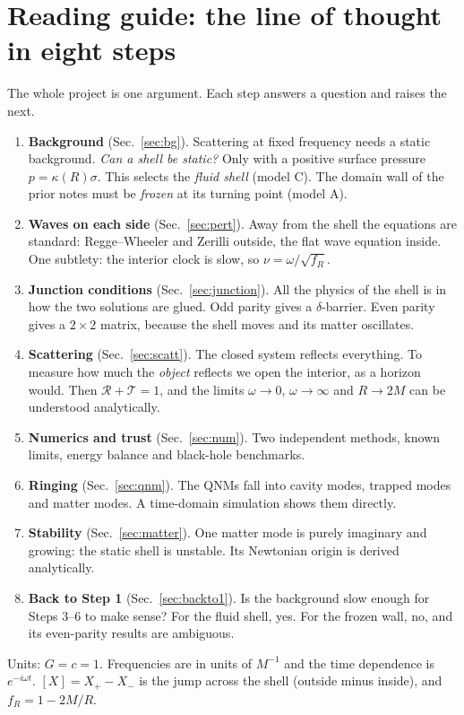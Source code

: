 \documentclass[11pt,a4paper]{article}
\numberwithin{equation}{section}
\newcommand{\sq}{\sqrt{f_R}}
\newcommand{\RR}{\mathcal R}
\newcommand{\TT}{\mathcal T}
\begin{document}
\section*{Reading guide: the line of thought in eight steps}
The whole project is one argument. Each step answers a question and raises the next.
\begin{enumerate}[label=\textbf{Step \arabic*.},leftmargin=4.2em]
\item \textbf{Background} (Sec.~\ref{sec:bg}). Scattering at fixed frequency needs a static background. \emph{Can a shell
be static?} Only with a positive surface pressure $p=\kappa(R)\sigma$. This selects the \emph{fluid shell} (model C). The
domain wall of the prior notes must be \emph{frozen} at its turning point (model A).
\item \textbf{Waves on each side} (Sec.~\ref{sec:pert}). Away from the shell the equations are standard: Regge--Wheeler
and Zerilli outside, the flat wave equation inside. One subtlety: the interior clock is slow, so $\nu=\omega/\sq$.
\item \textbf{Junction conditions} (Sec.~\ref{sec:junction}). All the physics of the shell is in how the two solutions
are glued. Odd parity gives a $\delta$-barrier. Even parity gives a $2\times2$ matrix, because the shell moves and its
matter oscillates.
\item \textbf{Scattering} (Sec.~\ref{sec:scatt}). The closed system reflects everything. To measure how much the
\emph{object} reflects we open the interior, as a horizon would. Then $\RR+\TT=1$, and the limits
$\omega\to0$, $\omega\to\infty$ and $R\to2M$ can be understood analytically.
\item \textbf{Numerics and trust} (Sec.~\ref{sec:num}). Two independent methods, known limits, energy balance and
black-hole benchmarks.
\item \textbf{Ringing} (Sec.~\ref{sec:qnm}). The QNMs fall into cavity modes, trapped modes and matter modes. A
time-domain simulation shows them directly.
\item \textbf{Stability} (Sec.~\ref{sec:matter}). One matter mode is purely imaginary and growing: the static shell is
unstable. Its Newtonian origin is derived analytically.
\item \textbf{Back to Step 1} (Sec.~\ref{sec:backto1}). Is the background slow enough for Steps 3--6 to make sense? For
the fluid shell, yes. For the frozen wall, no, and its even-parity results are ambiguous.
\end{enumerate}
Units: $G=c=1$. Frequencies are in units of $M^{-1}$ and the time dependence is $e^{-i\omega t}$. $[X]=X_+-X_-$ is the
jump across the shell (outside minus inside), and $f_R=1-2M/R$.
\end{document}
